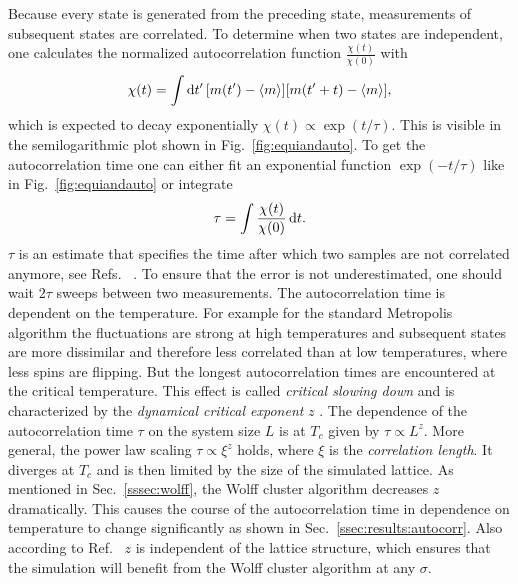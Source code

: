         Because every state is generated from the preceding state, measurements
        of subsequent states are correlated. To determine when two states
        are independent, one calculates the normalized autocorrelation function
        \(\frac{\chi(t)}{\chi(0)}\) with
        \begin{equation}
            \chi(t) = \int \mathrm{d} t' \, [m(t') -\left< m \right>][m(t'+t)-\left< m \right>],
        \end{equation}
        which is expected to decay exponentially
        \(\chi(t) \propto \exp(t/\tau)\). This is visible in the semilogarithmic
        plot shown in  Fig.\ \ref{fig:equiandauto}.
        To get the autocorrelation time one can either fit an exponential
        function \(\exp(-t/\tau)\) like in Fig.\ \ref{fig:equiandauto}
        or integrate
        \begin{equation}
            \tau = \int \frac{\chi(t)}{\chi(0)} \,\mathrm{d} t.
            \label{eq:tau}
        \end{equation}
        \(\tau\) is an estimate that specifies the time after which two
        samples are not correlated anymore, see Refs.\ \cite[p. 59ff]{NewmanBarkema1999} \cite[p. 150f]{Katzgraber2011}.
        To ensure that the error is not underestimated, one should wait
        \(2\tau\) sweeps between two measurements.
        The autocorrelation time is dependent on the temperature.
        For example for the standard Metropolis algorithm the fluctuations
        are strong at high temperatures and subsequent
        states are more dissimilar and therefore less correlated than at low
        temperatures, where less spins are flipping. But the longest
        autocorrelation times are encountered at the critical temperature.
        This effect is called \emph{critical slowing down} and is
        characterized by the \emph{dynamical critical exponent} \(z\)
        \cite{SwendsenWang1987}. The dependence of the autocorrelation time
        \(\tau\) on the system size \(L\) is at \(T_{c}\) given by \(\tau \propto L^z\).
        More general, the power law scaling \(\tau \propto \xi^z\) holds, where
        \(\xi\) is the \emph{correlation length}. It diverges at
        \(T_{c}\) and is then limited by the size of the simulated lattice.
        As mentioned in Sec.\ \ref{sssec:wolff}, the Wolff cluster algorithm
        decreases \(z\) dramatically. This causes the course of the autocorrelation
        time in dependence on temperature to change significantly as shown in
        Sec.\ \ref{ssec:results:autocorr}. Also according to Ref.\ \cite{NewmanBarkema1999}
        \(z\) is independent of the lattice structure, which ensures that
        the simulation will benefit from the Wolff cluster algorithm at
        any \(\sigma\).


